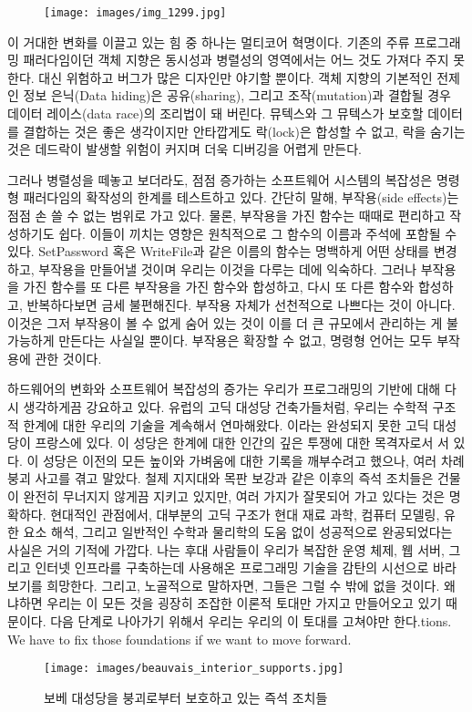 \begin{figure}[H]
\centering
\texttt{[image: images/img\_1299.jpg]}
\end{figure}

\noindent
이 거대한 변화를 이끌고 있는 힘 중 하나는 멀티코어 혁명이다.
기존의 주류 프로그래밍 패러다임이던 객체 지향은 동시성과 병렬성의 영역에서는 어느 것도 가져다 주지 못 한다.
대신 위험하고 버그가 많은 디자인만 야기할 뿐이다.
객체 지향의 기본적인 전제인 정보 은닉(Data hiding)은 공유(sharing), 그리고 조작(mutation)과 결합될 경우 데이터 레이스(data race)의 조리법이 돼 버린다.
뮤텍스와 그 뮤텍스가 보호할 데이터를 결합하는 것은 좋은 생각이지만 안타깝게도 락(lock)은 합성할 수 없고, 락을 숨기는 것은 데드락이 발생할 위험이 커지며 더욱 디버깅을 어렵게 만든다.

그러나 병렬성을 떼놓고 보더라도, 점점 증가하는 소프트웨어 시스템의 복잡성은 명령형 패러다임의 확작성의 한계를 테스트하고 있다.
간단히 말해, 부작용(side effects)는 점점 손 쓸 수 없는 범위로 가고 있다. 물론, 부작용을 가진 함수는 때때로 편리하고 작성하기도 쉽다.
이들이 끼치는 영향은 원칙적으로 그 함수의 이름과 주석에 포함될 수 있다.
SetPassword 혹은 WriteFile과 같은 이름의 함수는 명백하게 어떤 상태를 변경하고, 부작용을 만들어낼 것이며 우리는 이것을 다루는 데에 익숙하다.
그러나 부작용을 가진 함수를 또 다른 부작용을 가진 함수와 합성하고, 다시 또 다른 함수와 합성하고, 반복하다보면 금세 불편해진다. 
부작용 자체가 선천적으로 나쁘다는 것이 아니다. 이것은 그저 부작용이 볼 수 없게 숨어 있는 것이 이를 더 큰 규모에서 관리하는 게 불가능하게 만든다는 사실일 뿐이다.
부작용은 확장할 수 없고, 명령형 언어는 모두 부작용에 관한 것이다.

하드웨어의 변화와 소프트웨어 복잡성의 증가는 우리가 프로그래밍의 기반에 대해 다시 생각하게끔 강요하고 있다.
유럽의 고딕 대성당 건축가들처럼, 우리는 수학적 구조적 한계에 대한 우리의 기술을 계속해서 연마해왔다. 
이라는 완성되지 못한 고딕 대성당이 프랑스에 있다.
이 성당은 한계에 대한 인간의 깊은 투쟁에 대한 목격자로서 서 있다.
이 성당은 이전의 모든 높이와 가벼움에 대한 기록을 깨부수려고 했으나, 여러 차례 붕괴 사고를 겪고 말았다.
철제 지지대와 목판 보강과 같은 이후의 즉석 조치들은 건물이 완전히 무너지지 않게끔 지키고 있지만, 여러 가지가 잘못되어 가고 있다는 것은 명확하다.
현대적인 관점에서, 대부분의 고딕 구조가 현대 재료 과학, 컴퓨터 모델링, 유한 요소 해석, 그리고 일반적인 수학과 물리학의 도움 없이 성공적으로 완공되었다는 사실은 거의 기적에 가깝다.
나는 후대 사람들이 우리가 복잡한 운영 체제, 웹 서버, 그리고 인터넷 인프라를 구축하는데 사용해온 프로그래밍 기술을 감탄의 시선으로 바라보기를 희망한다.
그리고, 노골적으로 말하자면, 그들은 그럴 수 밖에 없을 것이다. 왜냐하면 우리는 이 모든 것을 굉장히 조잡한 이론적 토대만 가지고 만들어오고 있기 때문이다.
다음 단계로 나아가기 위해서 우리는 우리의 이 토대를 고쳐야만 한다.tions. We have to fix
those foundations if we want to move forward.

\begin{figure}
\centering
\texttt{[image: images/beauvais\_interior\_supports.jpg]}
\caption{보베 대성당을 붕괴로부터 보호하고 있는 즉석 조치들}
\end{figure}
